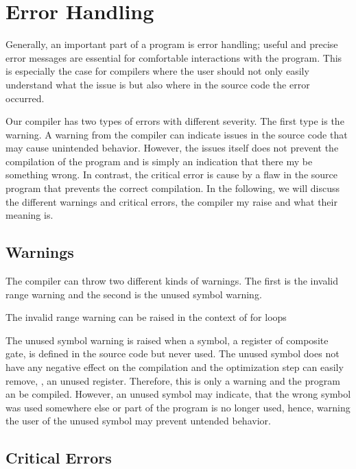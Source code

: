 \section{Error Handling}
Generally, an important part of a program is error handling; useful and precise error messages are essential for comfortable interactions with the program. This is especially the case for compilers where the user should not only easily understand what the issue is but also where in the source code the error occurred.  

Our compiler has two types of errors with different severity. The first type is the warning. A warning from the compiler can indicate issues in the source code that may cause unintended behavior. However, the issues itself does not prevent the compilation of the program and is simply an indication that there my be something wrong. In contrast, the critical error is cause by a flaw in the source program that prevents the correct compilation. In the following, we will discuss the different warnings and critical errors, the compiler my raise and what their meaning is.

\subsection{Warnings}
The compiler can throw two different kinds of warnings. The first is the invalid range warning and the second is the unused symbol warning.

The invalid range warning can be raised in the context of for loops

The unused symbol warning is raised when a symbol, \eg a register of composite gate, is defined in the source code but never used. The unused symbol does not have any negative effect on the compilation and the optimization step can easily remove, \eg, an unused register. Therefore, this is only a warning and the program an be compiled. However, an unused symbol may indicate, that the wrong symbol was used somewhere else or part of the program is no longer used, hence, warning the user of the unused symbol may prevent untended behavior.

\subsection{Critical Errors}